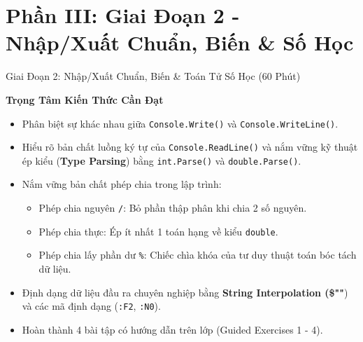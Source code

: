 \documentclass[aspectratio=169, 10pt]{beamer}
\begin{document}
\section{Phần III: Giai Đoạn 2 - Nhập/Xuất Chuẩn, Biến \& Số Học}

\begin{frame}{Giai Đoạn 2: Nhập/Xuất Chuẩn, Biến \& Toán Tử Số Học (60 Phút)}
  \begin{block}{\textbf{Trọng Tâm Kiến Thức Cần Đạt}}
    \begin{itemize}
      \item Phân biệt sự khác nhau giữa \texttt{Console.Write()} và \texttt{Console.WriteLine()}.
      \item Hiểu rõ bản chất luồng ký tự của \texttt{Console.ReadLine()} và nắm vững kỹ thuật ép kiểu (\textbf{Type Parsing}) bằng \texttt{int.Parse()} và \texttt{double.Parse()}.
      \item Nắm vững bản chất phép chia trong lập trình:
        \begin{itemize}
          \item Phép chia nguyên \texttt{/}: Bỏ phần thập phân khi chia 2 số nguyên.
          \item Phép chia thực: Ép ít nhất 1 toán hạng về kiểu \texttt{double}.
          \item Phép chia lấy phần dư \texttt{\%}: Chiếc chìa khóa của tư duy thuật toán bóc tách dữ liệu.
        \end{itemize}
      \item Định dạng dữ liệu đầu ra chuyên nghiệp bằng \textbf{String Interpolation (\$""}) và các mã định dạng (\texttt{:F2}, \texttt{:N0}).
      \item Hoàn thành 4 bài tập có hướng dẫn trên lớp (Guided Exercises 1 - 4).
    \end{itemize}
  \end{block}
\end{frame}
\end{document}
